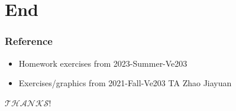 \documentclass{beamer}
\begin{document}
\section{End}
\begin{frame}
    \frametitle{Reference}

    \begin{itemize}
        \item Homework exercises from 2023-Summer-Ve203
        \item Exercises/graphics from 2021-Fall-Ve203 TA Zhao Jiayuan
    \end{itemize}

\end{frame}
\begin{frame}
    \centering
    \Huge{$\mathcal{THANKS}$!}
\end{frame}
\end{document}
